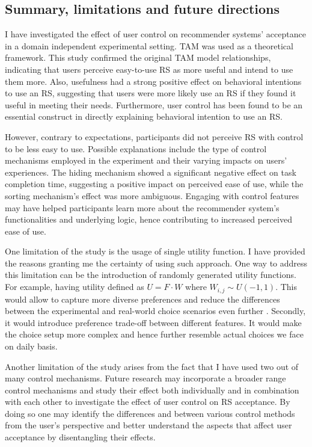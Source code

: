 \documentclass[a4paper,12pt]{article}
\begin{document}
\subsection{Summary, limitations and future directions}

I have investigated the effect of user control on recommender systems' acceptance in a domain independent experimental setting. TAM was used as a theoretical framework. This study confirmed the original TAM model relationships, indicating that users perceive easy-to-use RS as more useful and intend to use them more. Also, usefulness had a strong positive effect on behavioral intentions to use an RS, suggesting that users were more likely use an RS if they found it useful in meeting their needs. Furthermore, user control has been found to be an essential construct in directly explaining behavioral intention to use an RS.

However, contrary to expectations, participants did not perceive RS with control to be less easy to use. Possible explanations include the type of control mechanisms employed in the experiment and their varying impacts on users' experiences. The hiding mechanism showed a significant negative effect on task completion time, suggesting a positive impact on perceived ease of use, while the sorting mechanism's effect was more ambiguous. Engaging with control features may have helped participants learn more about the recommender system's functionalities and underlying logic, hence contributing to increased perceived ease of use.

One limitation of the study is the usage of single utility function. I have provided the reasons granting me the certainty of using such approach. One way to address this limitation can be the introduction of randomly generated utility functions. For example, having utility defined as $U = F \cdot W$ where $W_{i,j} \sim U(-1,1)$. This would allow to capture more diverse preferences and reduce the differences between the experimental and real-world choice scenarios even further \citep{vesanen2007personalization}. Secondly, it would introduce preference trade-off between different features. It would make the choice setup more complex and hence further resemble actual choices we face on daily basis.

Another limitation of the study arises from the fact that I have used two out of many control mechanisms. Future research may incorporate a broader range control mechanisms and study their effect both individually and in combination with each other to investigate the effect of user control on RS acceptance. By doing so one may identify the differences and between various control methods from the user's perspective and better understand the aspects that affect user acceptance by disentangling their effects. 
\end{document}
